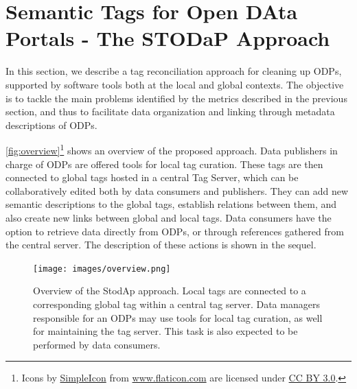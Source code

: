 \documentclass[conference]{IEEEtran}
\begin{document}





\section{Semantic Tags for Open DAta Portals - The STODaP Approach}
\label{sec:stodap}

In this section, we describe a tag reconciliation approach for cleaning up ODPs, supported by software tools both at the local and global contexts.
The objective is to tackle the main problems identified by the metrics described in the previous section, and thus to facilitate data organization and linking through metadata descriptions of ODPs.

\autoref{fig:overview}\footnote{Icons by \href{http://www.flaticon.com/authors/simpleicon}{SimpleIcon} from \href{http://www.flaticon.com}{www.flaticon.com} are licensed under \href{http://creativecommons.org/licenses/by/3.0/}{CC BY 3.0}.} shows an overview of the proposed approach.
Data publishers in charge of ODPs are offered tools for local tag curation.
These tags are then connected to global tags hosted in a central Tag Server, which can be collaboratively edited both by data consumers and publishers. 
They can add new semantic descriptions to the global tags, establish relations between them, and also create new links between global and local tags.
Data consumers have the option to retrieve data directly from ODPs, or through references gathered from the central server.
The description of these actions is shown in the sequel.

\begin{figure}[tb]
\begin{center}
\texttt{[image: images/overview.png]}
\caption{Overview of the StodAp approach. Local tags are connected to a corresponding global tag within a central tag server. 
Data managers responsible for an ODPs may use tools for local tag curation, as well for maintaining the tag server. 
This task is also expected to be performed by data consumers.}
\label{fig:overview}
\end{center}
\end{figure}
\end{document}
